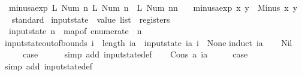 \begin{isabellebody}
\ \ {\isachardoublequoteopen}minus{\isacharunderscore}aexp\ {\isacharparenleft}L\ {\isacharparenleft}Num\ n{}{\isacharparenright}{\isacharparenright}\ {\isacharparenleft}L\ {\isacharparenleft}Num\ n{}{\isacharparenright}{\isacharparenright}\ {\isacharequal}\ L\ {\isacharparenleft}Num\ {\isacharparenleft}n{}{\isacharminus}n{}{\isacharparenright}{\isacharparenright}{\isachardoublequoteclose}\ {\isacharbar}\isanewline
\ \ {\isachardoublequoteopen}minus{\isacharunderscore}aexp\ x\ y\ {\isacharequal}\ Minus\ x\ y{\isachardoublequoteclose}\isanewline
\isanewline
{}\isamarkupfalse%
%
\isadelimproof
\ %
\endisadelimproof
%
\isatagproof
{}\isamarkupfalse%
\ standard%
\endisatagproof
{\isafoldproof}%
%
\isadelimproof
%
\endisadelimproof
\isanewline
{}\isamarkupfalse%
\isanewline
\isanewline
{}\isamarkupfalse%
\ input{}state\ {\isacharcolon}{\isacharcolon}\ {\isachardoublequoteopen}value\ list\ {\isasymRightarrow}\ registers{\isachardoublequoteclose}\ \isanewline
\ \ {\isachardoublequoteopen}input{}state\ n\ {\isacharequal}\ map{\isacharunderscore}of\ {\isacharparenleft}enumerate\ {}\ n{\isacharparenright}{\isachardoublequoteclose}\isanewline
\isanewline
{}\isamarkupfalse%
\ input{}state{\isacharunderscore}out{\isacharunderscore}of{\isacharunderscore}bounds{\isacharcolon}\ {\isachardoublequoteopen}i\ {\isasymge}\ length\ ia\ {\isasymLongrightarrow}\ input{}state\ ia\ i\ {\isacharequal}\ None{\isachardoublequoteclose}\isanewline
%
\isadelimproof
%
\endisadelimproof
%
\isatagproof
{}\isamarkupfalse%
{\isacharparenleft}induct\ {\isachardoublequoteopen}ia{\isachardoublequoteclose}{\isacharparenright}\isanewline
\ \ \isamarkupfalse%
\ Nil\isanewline
\ \ \isamarkupfalse%
\ \isamarkupfalse%
\ {\isacharquery}case\isanewline
\ \ \ \ \isamarkupfalse%
\ {\isacharparenleft}simp\ add{\isacharcolon}\ input{}state{\isacharunderscore}def{\isacharparenright}\isanewline
{}\isamarkupfalse%
\isanewline
\ \ \isamarkupfalse%
\ {\isacharparenleft}Cons\ a\ ia{\isacharparenright}\isanewline
\ \ \isamarkupfalse%
\ \isamarkupfalse%
\ {\isacharquery}case\isanewline
\ \ \ \ \isamarkupfalse%
\ {\isacharparenleft}simp\ add{\isacharcolon}\ input{}state{\isacharunderscore}def{\isacharparenright}\isanewline

\end{isabellebody}
